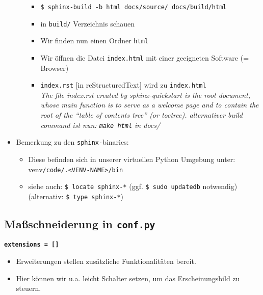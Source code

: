 \begin{itemize}
\begin{itemize}
	\begin{itemize}

		\item
		\texttt{\$ sphinx-build\ -b\ html\ docs/source/\ docs/build/html}
		\item
		in \texttt{build/} Verzeichnis schauen
		\item
		Wir finden nun einen Ordner \texttt{html}
		\item
		Wir öffnen die Datei \texttt{index.html} mit einer geeigneten
		Software (= Browser)
		\item
		\texttt{index.rst} {[}in reStructuredText{]} wird zu \texttt{index.html}\\
\textit{			The file index.rst created by sphinx-quickstart is the root
			document, whose main function is to serve as a welcome page and to
			contain the root of the ``table of contents tree'' (or toctree).
			alternativer build command ist nun: \texttt{make\ html} in docs/}
	\end{itemize}
	\end{itemize}

	\item
	Bemerkung zu den \texttt{sphinx-}binaries:

	\begin{itemize}

		\item
		Diese befinden sich in unserer virtuellen Python Umgebung unter:
		venv\texttt{/code/.\textless{}VENV-NAME\textgreater{}/bin}
		\item
		siehe auch: \texttt{\$\ locate\ sphinx-*} (ggf.
		\texttt{\$ sudo\ updatedb} notwendig) (alternativ:
		\texttt{\$ type\ sphinx-*})
	\end{itemize}
\end{itemize}

\subsection{Maßschneiderung in \texttt{conf.py}}

\textbf{\texttt{extensions\ =\ {[}{]}}}

\begin{itemize}

	\item
	Erweiterungen stellen zusätzliche Funktionalitäten bereit.
	\item
	Hier können wir u.a. leicht Schalter setzen, um das Erscheinungsbild zu
	steuern.
\end{itemize}

